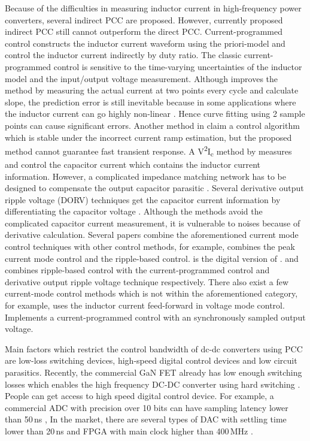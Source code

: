 Because of the difficulties in measuring inductor current in high-frequency power converters, several indirect PCC are proposed. However, currently proposed indirect PCC  still cannot outperform the direct PCC.
Current-programmed control constructs the inductor current waveform using the priori-model and control the inductor current indirectly by duty ratio.
The classic current-programmed control \cite{Chendragan2003} is sensitive to the time-varying uncertainties of the inductor model and the input/output voltage measurement. Although \cite{Taeed2014} improves the method by measuring the actual current at two points every cycle and calculate slope, the prediction error is still inevitable because in some applications where the inductor current can go highly non-linear \cite{Ahsanuzzamanprodic2012apec} \cite{DiCapua2016}. Hence curve fitting using 2 sample points can cause significant errors. Another method in \cite{Chattopadhyay2006} claim a control algorithm which is stable under the incorrect current ramp estimation, but the proposed method cannot guarantee fast transient response.
A V\textsuperscript{2}I\textsubscript{c} method by \cite{Huerta2013} measures and control the capacitor current which contains the inductor current information.
However, a complicated impedance matching network has to be designed to compensate the output capacitor parasitic 
\cite{Huerta2009a}. Several derivative output ripple voltage (DORV) techniques get the capacitor current information by differentiating the capacitor voltage \cite{Mai2008} \cite{Chen2017}. Although the methods avoid the complicated capacitor current measurement, it is vulnerable to noises because of derivative calculation. 
Several papers combine the aforementioned current mode control techniques with other control methods, for example, \cite{Huang2002} combines the peak current mode control and the ripple-based control. \cite{Cheng2014a} is the digital version of \cite{Huang2002}. \cite{Cheng2013} and \cite{Liu2018} combines ripple-based control with the current-programmed control and derivative output ripple voltage technique respectively. There also exist a few current-mode control methods which is not within the aforementioned category, for example, \cite{Kurokawa2016} uses the inductor current feed-forward in voltage mode control. \cite{Saggini2004} Implements a current-programmed control with an synchronously sampled output voltage.

Main factors which restrict the control bandwidth of dc-dc converters using PCC are low-loss switching devices, high-speed digital control devices and low circuit parasitics. Recently, the commercial GaN FET already has low enough switching losses which enables the high frequency DC-DC converter using hard switching \cite{Huang2014c}.
People can get access to high speed digital control device. For example, a commercial ADC with precision over 10 bits can have sampling latency lower than 50\,ns \cite{dsAD9215,dsMAX1214}, In the market, there are several types of DAC with settling time lower than 20\,ns \cite{dsLTC1666, dsAD9744} and FPGA with main clock higher than 400\,MHz \cite{dsARTIX72018}. 

